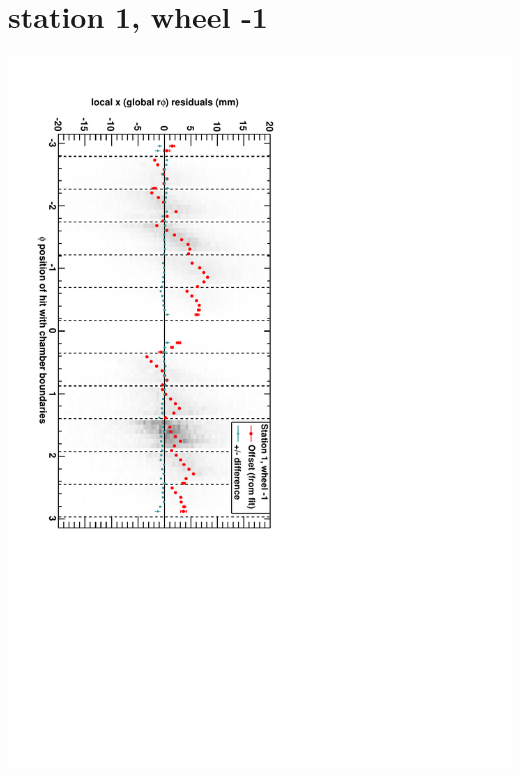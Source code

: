 \documentclass[compress]{beamer}
\begin{document}
\section*{station 1, wheel -1}
\begin{frame} \vfill \mbox{\hspace{-1 cm}\includegraphics[height=1.2\linewidth, angle=90]{DTrphiVsPhi_st1_whB.pdf}} \end{frame}
\end{document}
